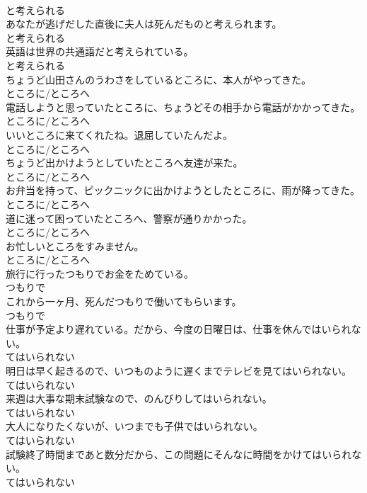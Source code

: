 \documentclass[8pt]{extreport}
\begin{document}
\begin{CJK}{UTF8}{min}
\\	と考えられる	
\\	あなたが逃げだした直後に夫人は死んだものと考えられます。	
\\	と考えられる	
\\	英語は世界の共通語だと考えられている。	
\\	と考えられる	
\\	ちょうど山田さんのうわさをしているところに、本人がやってきた。	
\\	ところに/ところへ	
\\	電話しようと思っていたところに、ちょうどその相手から電話がかかってきた。	
\\	ところに/ところへ	
\\	いいところに来てくれたね。退屈していたんだよ。	
\\	ところに/ところへ	
\\	ちょうど出かけようとしていたところへ友達が来た。	
\\	ところに/ところへ	
\\	お弁当を持って、ピックニックに出かけようとしたところに、雨が降ってきた。	
\\	ところに/ところへ	
\\	道に迷って困っていたところへ、警察が通りかかった。	
\\	ところに/ところへ	
\\	お忙しいところをすみません。	
\\	ところに/ところへ	
\\	旅行に行ったつもりでお金をためている。	
\\	つもりで	
\\	これから一ヶ月、死んだつもりで働いてもらいます。	
\\	つもりで	
\\	仕事が予定より遅れている。だから、今度の日曜日は、仕事を休んではいられない。	
\\	てはいられない	
\\	明日は早く起きるので、いつものように遅くまでテレビを見てはいられない。	
\\	てはいられない	
\\	来週は大事な期末試験なので、のんびりしてはいられない。	
\\	てはいられない	
\\	大人になりたくないが、いつまでも子供ではいられない。	
\\	てはいられない	
\\	試験終了時間まであと数分だから、この問題にそんなに時間をかけてはいられない。	
\\	てはいられない	

\end{CJK}
\end{document}
